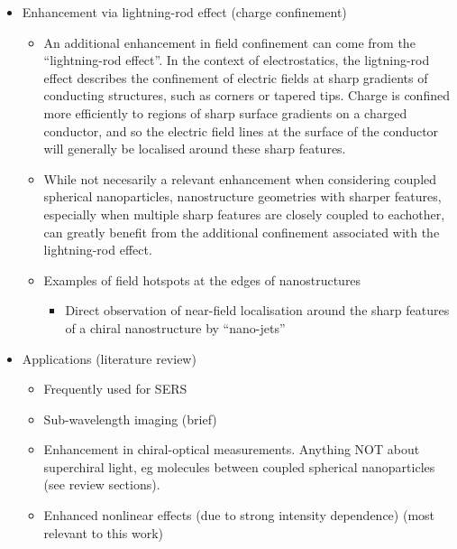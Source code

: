 \begin{itemize}
\begin{itemize}
        \end{itemize}
    \item Enhancement via lightning-rod effect (charge confinement)
    \begin{itemize}
        \item An additional enhancement in field confinement can come from the ``lightning-rod effect''. In the context of electrostatics, the ligtning-rod effect describes the confinement of electric fields at sharp gradients of conducting structures, such as corners or tapered tips. Charge is confined more efficiently to regions of sharp surface gradients on a charged conductor, and so the electric field lines at the surface of the conductor will generally be localised around these sharp features.
        \item While not necesarily a relevant enhancement when considering coupled spherical nanoparticles, nanostructure geometries with sharper features, especially when multiple sharp features are closely coupled to eachother, can greatly benefit from the additional confinement associated with the lightning-rod effect.
        \item Examples of field hotspots at the edges of nanostructures
        \begin{itemize}
            \item Direct observation of near-field localisation around the sharp features of a chiral nanostructure by ``nano-jets''~\cite{Valev2012d}
        \end{itemize}
    \end{itemize}
    
    \item Applications (literature review)
    \begin{itemize}
        \item Frequently used for SERS
        \item Sub-wavelength imaging (brief)
        \item Enhancement in chiral-optical measurements. Anything NOT about superchiral light, eg molecules between coupled spherical nanoparticles (see review sections).
        \item Enhanced nonlinear effects (due to strong intensity dependence) (most relevant to this work)
    \end{itemize}
\end{itemize}

